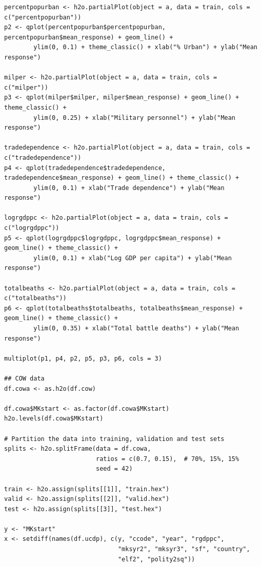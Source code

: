 \begin{verbatim}
percentpopurban <- h2o.partialPlot(object = a, data = train, cols = c("percentpopurban"))
p2 <- qplot(percentpopurban$percentpopurban, percentpopurban$mean_response) + geom_line() +
        ylim(0, 0.1) + theme_classic() + xlab("% Urban") + ylab("Mean response")

milper <- h2o.partialPlot(object = a, data = train, cols = c("milper"))
p3 <- qplot(milper$milper, milper$mean_response) + geom_line() + theme_classic() +
        ylim(0, 0.25) + xlab("Military personnel") + ylab("Mean response")

tradedependence <- h2o.partialPlot(object = a, data = train, cols = c("tradedependence"))
p4 <- qplot(tradedependence$tradedependence, tradedependence$mean_response) + geom_line() + theme_classic() +
        ylim(0, 0.1) + xlab("Trade dependence") + ylab("Mean response")

logrgdppc <- h2o.partialPlot(object = a, data = train, cols = c("logrgdppc"))
p5 <- qplot(logrgdppc$logrgdppc, logrgdppc$mean_response) + geom_line() + theme_classic() +
        ylim(0, 0.1) + xlab("Log GDP per capita") + ylab("Mean response")

totalbeaths <- h2o.partialPlot(object = a, data = train, cols = c("totalbeaths"))
p6 <- qplot(totalbeaths$totalbeaths, totalbeaths$mean_response) + geom_line() + theme_classic() +
        ylim(0, 0.35) + xlab("Total battle deaths") + ylab("Mean response")

multiplot(p1, p4, p2, p5, p3, p6, cols = 3)

## COW data
df.cowa <- as.h2o(df.cow)

df.cowa$MKstart <- as.factor(df.cowa$MKstart)
h2o.levels(df.cowa$MKstart)

# Partition the data into training, validation and test sets
splits <- h2o.splitFrame(data = df.cowa, 
                         ratios = c(0.7, 0.15),  # 70%, 15%, 15%
                         seed = 42) 

train <- h2o.assign(splits[[1]], "train.hex")   
valid <- h2o.assign(splits[[2]], "valid.hex") 
test <- h2o.assign(splits[[3]], "test.hex")

y <- "MKstart"
x <- setdiff(names(df.ucdp), c(y, "ccode", "year", "rgdppc",
                               "mksyr2", "mksyr3", "sf", "country",
                               "elf2", "polity2sq")) 


\end{verbatim}
